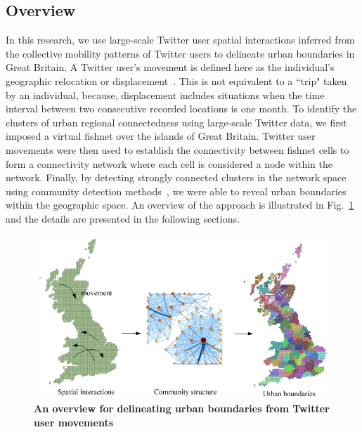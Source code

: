 \documentclass[]{tGIS2e}
\begin{document}
\subsection{Overview}
In this research, we use large-scale Twitter user spatial interactions inferred from the collective mobility patterns of Twitter users to delineate urban boundaries in Great Britain.
A Twitter user's movement is defined here as the individual's geographic relocation or displacement~\citep{gonzalez2008}.
This is not equivalent to a ``trip" taken by an individual, because, displacement includes situations when the time interval between two consecutive recorded locations is one month.
To identify the clusters of urban regional connectedness using large-scale Twitter data, we first imposed a virtual fishnet over the islands of Great Britain.
Twitter user movements were then used to establish the connectivity between fishnet cells to form a connectivity network where each cell is considered a node within the network. 
Finally, by detecting strongly connected clusters in the network space using community detection methods~\citep{coscia2011}, we were able to reveal urban boundaries within the geographic space. 
An overview of the approach is illustrated in Fig.~\ref{S1_Fig} and the details are presented in the following sections. 

\begin{figure}[ht]
\begin{center}
\includegraphics[width=1\linewidth]{./figure/S1_overview_Fig_2}
\caption{\bfseries{An overview for delineating urban boundaries from Twitter user movements}}
\label{S1_Fig}
\end{center}
\end{figure}
\end{document}
